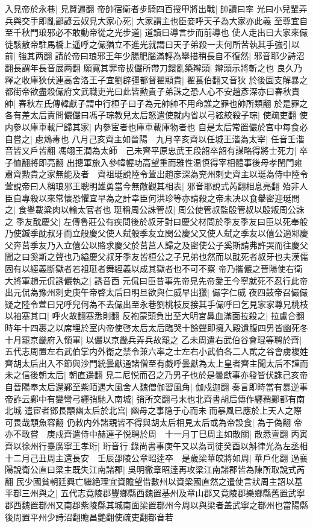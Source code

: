 入見帝於永巷|{
	見賢遍翻}
帝帥宿衛者步騎四百授甲將出戰|{
	帥讀曰率}
光曰小兒輩弄兵與交手即亂鄙諺云奴見大家心死|{
	大家謂主也臣妾呼天子為大家亦此義}
至尊宜自至千秋門琅邪必不敢動帝從之光步道|{
	道讀曰導言步而前導也}
使人走出曰大家來儼徒駭散帝駐馬橋上遥呼之儼猶立不進光就謂曰天子弟殺一夫何所苦執其手強引以前|{
	強其两翻}
請於帝曰琅邪王年少腸肥腦滿輕為舉措稍長自不復然|{
	邪音耶少詩沼翻長謂年長音展两翻}
願寛其罪帝拔儼所帶刀鐶亂築辮頭|{
	辮頭示將斬之也}
良久乃釋之收庫狄伏連高舍洛王子宜劉辟彊都督翟顯貴|{
	翟萇伯翻又音狄}
於後園支解暴之都街帝欲盡殺儼府文武職吏光曰此皆勲貴子弟誅之恐人心不安趙彥深亦曰春秋責帥|{
	春秋左氏傳韓獻子謂中行桓子曰子為元帥帥不用命誰之罪也帥所類翻}
於是罪之各有差太后責問儼儼曰馮子琮教兒太后怒遣使就内省以弓絃絞殺子琮|{
	使疏吏翻}
使内參以庫車載尸歸其家|{
	内參宦者也庫車載庫物者也}
自是太后常置儼於宫中每食必自嘗之|{
	慮鴆毒也}
八月己亥齊主如晉陽　九月辛亥齊以任城王湝為太宰|{
	任音壬湝音皆又戶皆翻}
馮翊王潤為太師　己未齊平原忠武王段韶卒韶有謀略得將士死力|{
	卒子恤翻將即亮翻}
出摠軍旅入參幃幄功高望重而雅性温慎得宰相體事後母孝閨門雍肅齊勲貴之家無能及者　齊祖珽說陸令萱出趙彦深為兖州刺史齊主以珽為侍中陸令萱說帝曰人稱琅邪王聰明雄勇當今無敵觀其相表|{
	邪音耶說式芮翻相息亮翻}
殆非人臣自專殺以來常懷恐懼宜早為之計幸臣何洪珍等亦請殺之帝未决以食轝密迎珽問之|{
	食轝載粱肉以輸太官者也}
珽稱周公誅管叔|{
	周公使管叔監殷管叔以殷叛周公誅之}
季友酖慶父|{
	左傳魯莊公有疾問後於叔牙對曰慶父材問於季友季友曰臣以死奉般乃使鍼季酖叔牙而立般慶父使人弑般季友立閔公慶父又使人弑之季友以僖公適邾慶父奔莒季友乃入立僖公以賂求慶父於莒莒人歸之及密使公子奚斯請弗許哭而往慶父聞之曰奚斯之聲也乃縊慶父叔牙季友皆桓公之子兄弟也然而以酖死者叔牙也夫漢儒固有以經義斷獄者若祖珽者舞經義以成其獄者也不可不察}
帝乃攜儼之晉陽使右衛大將軍趙元侃誘儼執之|{
	誘音酉}
元侃曰臣昔事先帝見先帝愛王今寧就死不忍行此帝出元侃為豫州刺史庚午帝啓太后曰明旦欲與仁威早出獵|{
	儼字仁威}
夜四鼓帝召儼儼疑之陸令萱曰兄呼兒何為不去儼出至永巷劉桃枝反接其手儼呼曰乞見家家尊兄桃枝以袖塞其口|{
	呼火故翻塞悉則翻}
反袍蒙頭負出至大明宮鼻血滿面拉殺之|{
	拉盧合翻}
時年十四裹之以席埋於室内帝使啓太后太后臨哭十餘聲即擁入殿遺腹四男皆幽死冬十月罷京畿府入領軍|{
	以儼以京畿兵弄兵故罷之}
乙未周遣右武伯谷會琨等聘於齊|{
	五代志周置左右武伯掌内外衛之禁令兼六率之士左右小武伯各二人貮之谷會虜複姓}
齊胡太后出入不節與沙門統曇獻通諸僧至有戱呼曇獻為太上皇者齊主聞太后不謹而未之信後朝太后|{
	朝直遥翻}
見二尼悦而召之乃男子也於是曇獻事亦發皆伏誅己亥帝自晉陽奉太后還鄴至紫陌遇大風舍人魏僧伽習風角|{
	伽戍迦翻}
奏言即時當有暴逆事帝詐云鄴中有變彎弓纒弰馳入南城|{
	弰所交翻弓末也北齊書胡后傳作纒矟鄴都有南北城}
遣宦者鄧長顒幽太后於北宫|{
	幽母之事隐于心而未而暴風已應於上天人之際可畏哉顒魚容翻}
仍敕内外諸親皆不得與胡太后相見太后或為帝設食|{
	為于偽翻}
帝亦不敢嘗　庚戍齊遣侍中赫連子悦聘於周　十一月丁巳周主如散關|{
	散悉亶翻}
丙寅齊以徐州行臺廣寧王孝珩|{
	珩音行}
錄尚書事庚午又以為司徒癸酉以斛律光為左丞相　十二月己丑周主還長安　壬辰邵陵公章昭逹卒　是歲梁華皎將如周|{
	華戶化翻}
過襄陽說衛公直曰梁主既失江南諸郡|{
	吳明徹章昭逹再攻梁江南諸郡皆為陳所取說式芮翻}
民少國貧朝廷興亡繼絶理宜資贍望借數州以資梁國直然之遣使言狀周主詔以基平鄀三州與之|{
	五代志竟陵郡豐鄉縣西魏置基州及章山郡又竟陵郡樂鄉縣舊置武寧郡西魏置鄀州又南郡紫陵縣其城南面梁置鄀州今周以與梁者盖武寧之鄀州也當陽縣後周置平州少詩沼翻贍昌艶翻使疏吏翻鄀音若}


